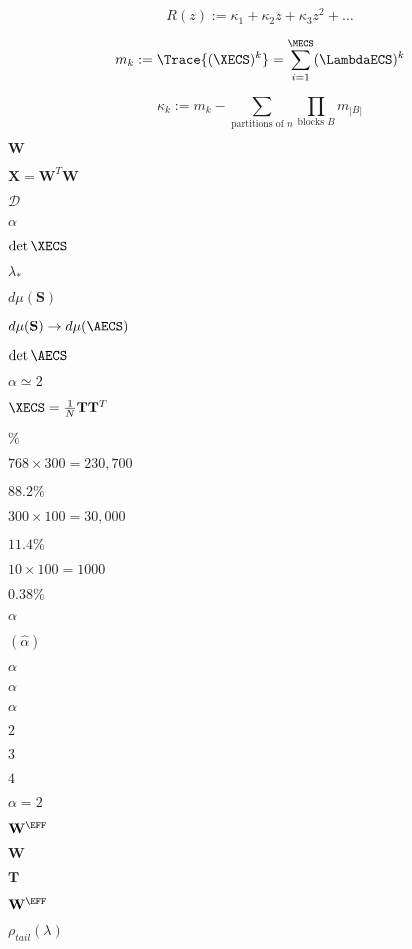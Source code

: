 \begin{equation}
  \label{eqn:Rz_expansion}
  R(z) := \kappa_1 + \kappa_2 z + \kappa_3 z^2 + \ldots 
\end{equation}

\begin{equation}
  \label{eqn:mk_defn}
  m_{k}:=\Trace{(\XECS)^{k}}=\sum_{i=1}^{\MECS}(\LambdaECS)^{k}
\end{equation}

\begin{equation}
  \label{eqn:kappa_defn}
  \kappa_k := m_k - \sum_{\text{partitions of } n} \prod_{\text{blocks } B} m_{|B|} 
\end{equation}

$\mathbf{W}$

$\mathbf{X}=\mathbf{W}^{T}\mathbf{W}$

$\mathcal{D}$

$\alpha$

$\det\XECS$

$\lambda_{*}$

$d\mu(\mathbf{S})$

$d\mu(\mathbf{S})\rightarrow d\mu(\AECS)$

$\det\AECS$

$\alpha\simeq 2$

$\XECS=\frac{1}{N}\mathbf{T}\mathbf{T}^T$


$\%$

$768 \times 300 = 230,700$

$88.2\%$

$300 \times 100 = 30,000$

$11.4\%$

$10 \times 100 = 1000$

$0.38\%$

$\alpha$

$(\hat{\alpha})$

$\alpha$

$\alpha$

$\alpha$

$2$

$3$

$4$

$\alpha=2$

$\mathbf{W}^{\EFF}$

$\mathbf{W}$

$\mathbf{T}$

$\mathbf{W}^{\EFF}$

$\rho_{tail}(\lambda)$

